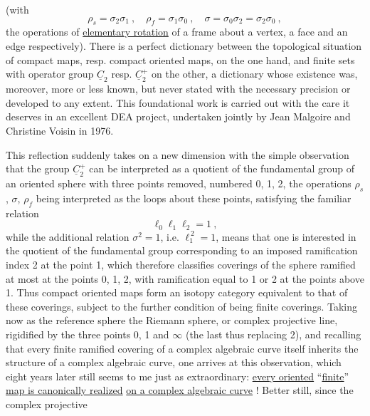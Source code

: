 
(with
\[ \rho_s = \sigma_2\sigma_1 \ , \quad \rho_f = \sigma_1\sigma_0 \ , \quad \sigma = \sigma_0\sigma_2 = \sigma_2\sigma_0 \ , \]
the operations of \uline{elementary rotation} of a frame about a vertex,
a face and an edge respectively). There is a perfect dictionary
between the topological situation of compact maps, resp.
compact oriented maps, on the one hand, and finite sets with
operator group $\underline{C}_2$ resp. $\underline{C}_2^+$ on the other, a dictionary whose
existence was, moreover, more or less known, but never
stated with the necessary precision or developed to any extent.
This foundational work is carried out with the care it deserves in
an excellent DEA project,
undertaken jointly by Jean Malgoire and
Christine Voisin in 1976.

This reflection suddenly takes on a new dimension
with the simple observation that the group $\underline{C}_2^+$ can be interpreted
as a quotient of the fundamental group of an oriented sphere with
three points removed, numbered 0, 1, 2, the operations $\rho_s$, $\sigma$, $\rho_f$
being interpreted as the loops about these points, satisfying
the familiar relation
\[ \ell_0\ell_1\ell_2 = 1 \ , \]
while the additional relation $\sigma^2 = 1$, i.e. $\ell_1^{\,2} = 1$, means
that one is interested in the quotient of the fundamental group corresponding
to an imposed ramification index 2 at the point 1, which therefore classifies
coverings of the sphere ramified at most at the
points 0, 1, 2, with ramification equal to 1 or 2 at the points
above 1. Thus compact oriented maps form an
isotopy category equivalent to that of these coverings, subject
to the further condition of being finite coverings.
Taking now as the reference sphere the Riemann sphere,
or complex projective line, rigidified by the three points 0, 1
and $\infty$ (the last thus replacing 2), and recalling that every
finite ramified covering of a complex algebraic curve itself inherits
the structure of a complex algebraic curve, one arrives at this
observation, which eight years later still seems to me just as
extraordinary: \uline{every oriented} ``\uline{finite}'' \uline{map is canonically realized}
\uline{on a complex algebraic curve} ! Better still, since the complex projective


